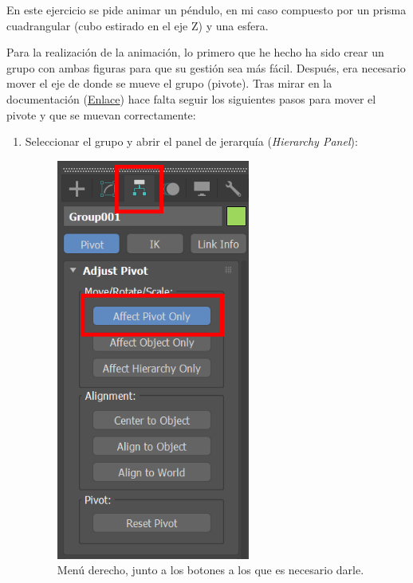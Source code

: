 \documentclass{article}
\begin{document}
En este ejercicio se pide animar un péndulo, en mi caso compuesto por un prisma cuadrangular (cubo estirado en el eje Z) y una esfera.


Para la realización de la animación, lo primero que he hecho ha sido crear un grupo con ambas figuras para que su gestión sea más fácil. Después, era necesario mover el eje de donde se mueve el grupo (pivote). Tras mirar en la documentación (\href{https://knowledge.autodesk.com/support/3ds-max/learn-explore/caas/CloudHelp/cloudhelp/2021/ENU/3DSMax-Animation/files/GUID-6872F014-4785-43D9-A83B-C774507907B3-htm.html}{Enlace}) hace falta seguir los siguientes pasos para mover el pivote y que se muevan correctamente:

\begin{enumerate}
    \item Seleccionar el grupo y abrir el panel de jerarquía (\textit{Hierarchy Panel}):
    
	\begin{figure}[H]
	    \centering
	    \includegraphics[width=0.6\textwidth]{imagenes/Ejercicio 3/pivote_menu.png}
	    \caption{Menú derecho, junto a los botones a los que es necesario darle.}
	\end{figure}



\end{enumerate}
\end{document}
